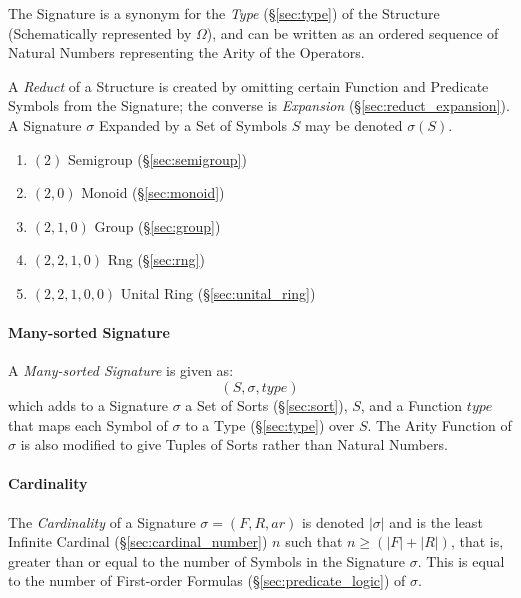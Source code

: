 The Signature is a synonym for the \emph{Type} (\S\ref{sec:type}) of
the Structure (Schematically represented by $\Omega$), and can be
written as an ordered sequence of Natural Numbers representing the
Arity of the Operators.

A \emph{Reduct} of a Structure is created by omitting certain Function
and Predicate Symbols from the Signature; the converse is
\emph{Expansion} (\S\ref{sec:reduct_expansion}). A Signature $\sigma$
Expanded by a Set of Symbols $S$ may be denoted $\sigma(S)$.

\begin{enumerate}
  \item $(2)$         Semigroup (\S\ref{sec:semigroup})
  \item $(2,0)$       Monoid (\S\ref{sec:monoid})
  \item $(2,1,0)$     Group (\S\ref{sec:group})
  \item $(2,2,1,0)$   Rng (\S\ref{sec:rng})
  \item $(2,2,1,0,0)$ Unital Ring (\S\ref{sec:unital_ring})
\end{enumerate}



\paragraph{Many-sorted Signature}\label{sec:manysorted_signature}\hfill

A \emph{Many-sorted Signature} is given as:
\[
  (S, \sigma, type)
\]
which adds to a Signature $\sigma$ a Set of Sorts (\S\ref{sec:sort}),
$S$, and a Function $type$ that maps each Symbol of $\sigma$ to a Type
(\S\ref{sec:type}) over $S$. The Arity Function of $\sigma$ is also
modified to give Tuples of Sorts rather than Natural Numbers.



\paragraph{Cardinality}\label{sec:signature_cardinality}\hfill

The \emph{Cardinality} of a Signature $\sigma = (F,R,ar)$ is denoted
$|\sigma|$ and is the least Infinite Cardinal
(\S\ref{sec:cardinal_number}) $n$ such that $n \geq (|F| + |R|)$, that
is, greater than or equal to the number of Symbols in the Signature
$\sigma$. This is equal to the number of First-order Formulas
(\S\ref{sec:predicate_logic}) of $\sigma$.




